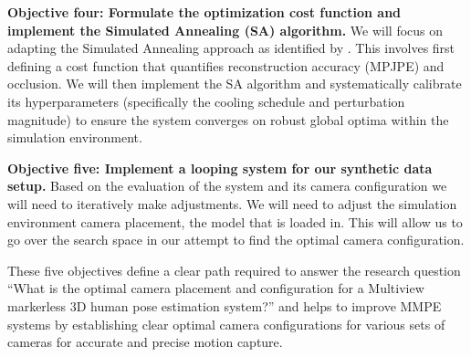 \textbf{Objective four: Formulate the optimization cost function and implement the Simulated Annealing (SA) algorithm.} We will focus on adapting the Simulated Annealing approach as identified by \citet{rahimian2016optimal}. This involves first defining a cost function that quantifies reconstruction accuracy (MPJPE) and occlusion. We will then implement the SA algorithm and systematically calibrate its hyperparameters (specifically the cooling schedule and perturbation magnitude) to ensure the system converges on robust global optima within the simulation environment.

\textbf{Objective five: Implement a looping system for our synthetic data setup.} Based on the evaluation of the system and its camera configuration we will need to iteratively make adjustments. We will need to adjust the simulation environment camera placement, the model that is loaded in. This will allow us to go over the search space in our attempt to find the optimal camera configuration.


These five objectives define a clear path required to answer the research question ``What is the optimal camera placement and configuration for a Multiview markerless 3D human pose estimation system?'' and helps to improve MMPE systems by establishing clear optimal camera configurations for various sets of cameras for accurate and precise motion capture. 
